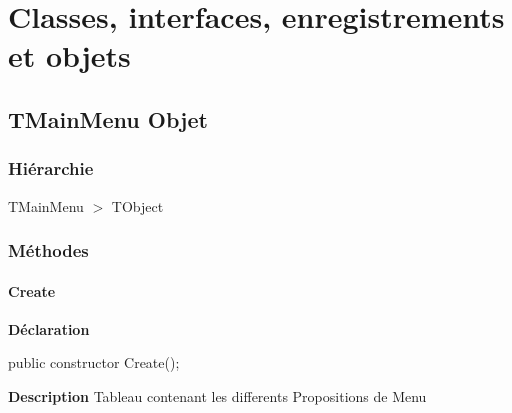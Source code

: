 \documentclass{report}
\newif\ifpdf
\begin{document}
\section{Classes, interfaces, enregistrements et objets}
\ifpdf
\subsection*{\large{\textbf{TMainMenu Objet}}\normalsize\hspace{1ex}\hrulefill}
\else
\subsection*{TMainMenu Objet}
\fi
\label{LesMenus.TMainMenu}
\subsubsection*{\large{\textbf{Hiérarchie}}\normalsize\hspace{1ex}\hfill}
TMainMenu {$>$} TObject
\subsubsection*{\large{\textbf{Méthodes}}\normalsize\hspace{1ex}\hfill}
\paragraph*{Create}\hspace*{\fill}

\label{LesMenus.TMainMenu-Create}
\begin{list}{}{
\setlength{\itemindent}{0cm}
\setlength{\listparindent}{0cm}
\setlength{\leftmargin}{\evensidemargin}
\addtolength{\leftmargin}{\tmplength}
\settowidth{\labelsep}{X}
\addtolength{\leftmargin}{\labelsep}
\setlength{\labelwidth}{\tmplength}
}
\item[\textbf{Déclaration}\hfill]
\ifpdf
\begin{flushleft}
\fi
\begin{ttfamily}
public constructor Create();\end{ttfamily}

\ifpdf
\end{flushleft}
\fi

\par
\item[\textbf{Description}]
Tableau contenant les differents Propositions de Menu

\end{list}
\end{document}
